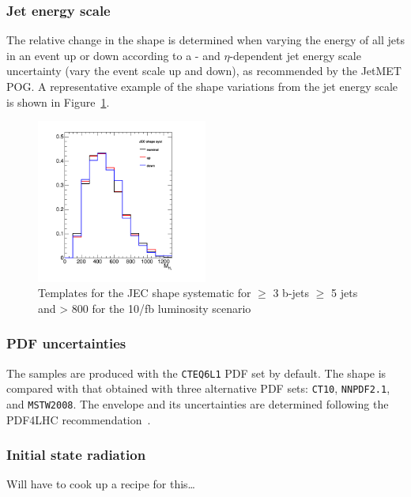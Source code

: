 \subsubsection{Jet energy scale\label{sec:sms-syst-jes}}
The relative change in the \mht shape is
determined when varying the energy of all jets in an event up or down
according to a \pt- and $\eta$-dependent jet energy scale uncertainty
(\ie vary the event scale up and down), as recommended by the JetMET
POG. A representative example of the shape variations from the jet energy scale 
is shown in Figure~\ref{fig:jec-shape}.

\begin{figure}[]
  \centering
  \includegraphics[width=0.5\textwidth]{figures/closureTests/mhtJetSyst_SMS_T1bbbb_2J_mGl1000_mLSP900_JEC_ge3b_ge5j_800_1600.png}
  \caption{\label{fig:jec-shape} Templates for the JEC shape systematic for $\geq$ 3 b-jets $\geq$ 5 jets and \scalht > 800 for the 10/fb luminosity scenario}
\end{figure}

\subsubsection{PDF uncertainties\label{sec:pdf-sets}}

\newcommand{\lcr}{Left: $\frac{\epsilon_{CTEQ6L1}}{\epsilon_{CT10}}$,
  center: $\frac{\epsilon_{CTEQ6L1}}{\epsilon_{MSTW08}}$, right:
  $\frac{\epsilon_{CTEQ6L1}}{\epsilon_{NNPDF2.1}}$}

The samples are produced with the \verb!CTEQ6L1! PDF set by
default. The shape is compared with that obtained with
three alternative PDF sets: \verb!CT10!, \verb!NNPDF2.1!, and
\verb!MSTW2008!. The envelope and its uncertainties are determined
following the PDF4LHC recommendation~\cite{pdf4lhc}.


\subsubsection{Initial state radiation\label{sec:sms-syst-isr}}
Will have to cook up a recipe for this\ldots


